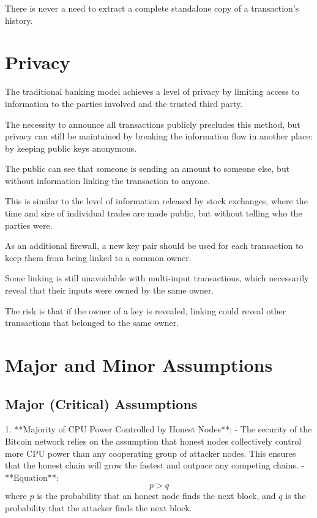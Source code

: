 \documentclass{article}
\begin{document}
There is never a need to extract a complete standalone copy of a transaction's history.

\section{Privacy}

The traditional banking model achieves a level of privacy by limiting access to information to the parties involved and the trusted third party.

The necessity to announce all transactions publicly precludes this method, but privacy can still be maintained by breaking the information flow in another place: by keeping public keys anonymous.

The public can see that someone is sending an amount to someone else, but without information linking the transaction to anyone.

This is similar to the level of information released by stock exchanges, where the time and size of individual trades are made public, but without telling who the parties were.

As an additional firewall, a new key pair should be used for each transaction to keep them from being linked to a common owner.

Some linking is still unavoidable with multi-input transactions, which necessarily reveal that their inputs were owned by the same owner.

The risk is that if the owner of a key is revealed, linking could reveal other transactions that belonged to the same owner.

\section{Major and Minor Assumptions}

\subsection{Major (Critical) Assumptions}

1. **Majority of CPU Power Controlled by Honest Nodes**:
   - The security of the Bitcoin network relies on the assumption that honest nodes collectively control more CPU power than any cooperating group of attacker nodes. This ensures that the honest chain will grow the fastest and outpace any competing chains.
   - **Equation**:
     \[
     p > q
     \]
     where \( p \) is the probability that an honest node finds the next block, and \( q \) is the probability that the attacker finds the next block.
\end{document}
